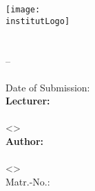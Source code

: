 
\begin{titlepage}
  \begin{center}
    \texttt{[image: \\institutLogo]}\\[4ex]

    \huge{\institutName}\\[1ex]
    \LARGE{\fakultaet}\\[1ex]
    \Large{{\studiengang} -- \studiengangKuerzel}\\[50pt]

    \huge{\textbf{\titel}}\\[1ex]
    \large{Date of Submission: \abgabeTermin}\\[50pt]

    \large
    \textbf{Lecturer:}\\
    \\
    <>\\[3ex]

    \textbf{Author:}\\
    \autorName\\
    <\autorEmail>\\
    Matr.-No.: \autorMatnr\\[50pt]

    \semester
  \end{center}
\end{titlepage}

